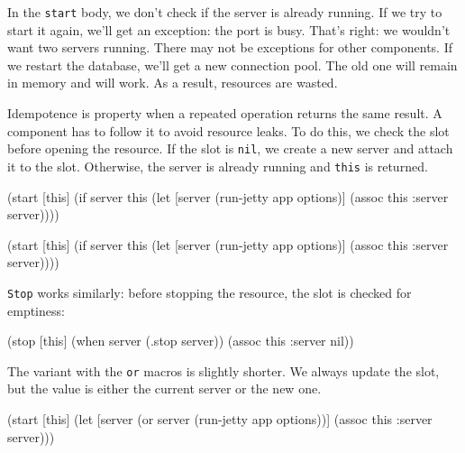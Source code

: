 \fi

In the \verb|start| body, we don't check if the server is already running. If we try to start it again, we'll get an exception: the port is busy. That's right: we wouldn't want two servers running. There may not be exceptions for other components. If we restart the database, we'll get a new connection pool. The old one will remain in memory and will work. As a result, resources are wasted.


Idempotence is property when a repeated operation returns the same result. A component has to follow it to avoid resource leaks. To do this, we check the slot before opening the resource. If the slot is \verb|nil|, we create a new server and attach it to the slot. Otherwise, the server is already running and \verb|this| is returned.

\ifnarrow

\begin{english}
  \begin{clojure}
(start [this]
  (if server
    this
    (let [server (run-jetty
                   app options)]
      (assoc this :server server))))
  \end{clojure}
\end{english}

\else

\begin{english}
  \begin{clojure}
(start [this]
  (if server
    this
    (let [server (run-jetty app options)]
      (assoc this :server server))))
  \end{clojure}
\end{english}

\fi

\verb|Stop| works similarly: before stopping the resource, the slot is checked for emptiness:

\begin{english}
  \begin{clojure}
(stop [this]
  (when server
    (.stop server))
  (assoc this :server nil))
  \end{clojure}
\end{english}

The variant with the \verb|or| macros is slightly shorter. We always update the slot, but the value is either the current server or the new one.

\ifnarrow

\begin{english}
  \begin{clojure}
(start [this]
  (let [server (or server
                   (run-jetty
                     app options))]
    (assoc this :server server)))
  \end{clojure}
\end{english}

